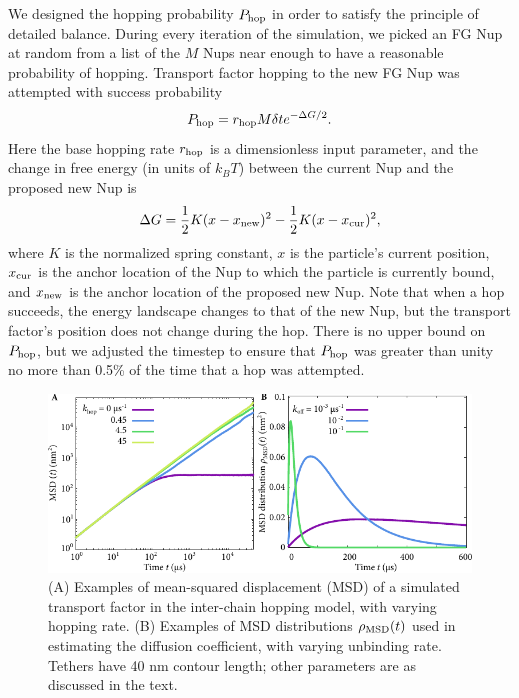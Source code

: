 We designed the hopping probability $P_{\rm hop}$ in order to satisfy the principle of detailed balance.  During every iteration of the simulation, we picked an FG Nup at random from a list of the $M$  Nups near enough to have a reasonable probability of hopping. Transport factor hopping to the new FG Nup was attempted with success probability
\begin{equation}
P_{\rm hop} = r_{\mathrm{hop}} M \delta t e^{-\Delta G /2}.
\end{equation}
Here the base hopping rate $r_{\mathrm{hop}}$ is a dimensionless input parameter, and the change in free energy (in units of $k_BT$) between the current Nup and the proposed new Nup is
\begin{equation}
  \Delta G = \frac{1}{2} K (x-x_{\mathrm{new}})^2 - \frac{1}{2} K (x -
  x_{\mathrm{cur}})^2,
\end{equation}
where $K$ is the normalized spring constant, $x$ is the particle's current position, $x_{\mathrm{cur}}$ is the anchor location of the Nup to which the particle is currently bound, and $x_{\mathrm{new}}$ is the anchor location of the proposed new Nup. Note that when a hop succeeds, the energy landscape changes to that of the new Nup, but the transport factor's position does not change during the hop.  There is no upper bound on $P_{\rm hop}$, but we adjusted the timestep to ensure that $P_{\rm hop}$ was greater than
unity no more than 0.5\% of the time that a hop was attempted.
\begin{figure}
\centering
\includegraphics[width=0.7\linewidth]{figs/ch02/integrand-example-plots.pdf}
\caption[Mean-squared displacement in the hopping simulation.]{(A) Examples of mean-squared displacement (MSD) of a simulated transport factor in the inter-chain hopping model, with varying hopping rate.  (B) Examples of MSD distributions $\rho_{\mathrm{MSD}} (t)$ used in estimating the diffusion coefficient, with varying unbinding rate. Tethers have 40 nm contour length; other parameters are as discussed in the text.}
\label{fig:integrand}
\end{figure}

